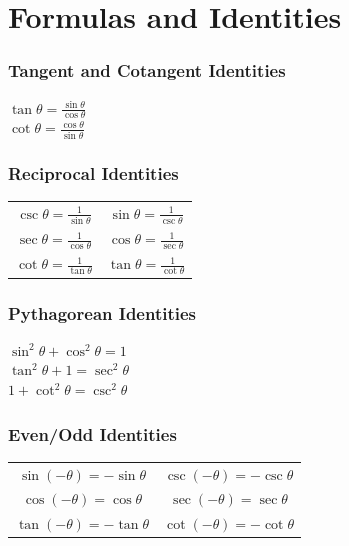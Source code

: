 \documentclass[10pt,onecolumn]{article}
\begin{document}
{\part{Formulas and Identities}

\section{Tangent and Cotangent Identities}


\(\tan \theta = \frac{\sin \theta}{\cos \theta}\) \\
\(\cot \theta = \frac{\cos \theta}{\sin \theta}\) \\

\section{Reciprocal Identities}
\begin{tabular}{c|c}
\(\csc \theta = \frac{1}{\sin \theta}\) & \(\sin \theta = \frac{1}{\csc \theta}\) \\
\(\sec \theta = \frac{1}{\cos \theta}\) & \(\cos \theta = \frac{1}{\sec \theta}\)\\
\(\cot \theta = \frac{1}{\tan \theta}\) & \(\tan \theta = \frac{1}{\cot \theta}\) \\
\end{tabular}

\section{Pythagorean  Identities}

\(\sin^2 \theta + \cos^2 \theta = 1 \) \\
\(\tan^2 \theta + 1 = \sec^2 \theta \) \\
\(1 + \cot^2 \theta = \csc^2 \theta \) \\



\section{Even/Odd Identities}
\begin{tabular}{c|c}
\(\sin(-\theta) = -\sin \theta\) & \(\csc(-\theta) = -\csc \theta\) \\
\(\cos(-\theta) = \cos \theta\) & \(\sec(-\theta) = \sec \theta\) \\
\(\tan(-\theta) = -\tan \theta\) &\(\cot(-\theta) = -\cot \theta\) \\
\end{tabular}


}
\end{document}

